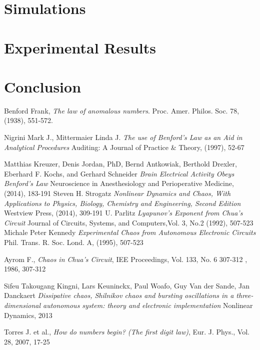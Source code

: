 \message{ !name(resultados.tex)}\documentclass[paper=a4, fontsize=11pt]{scrartcl} %
\numberwithin{equation}{section} %
\numberwithin{figure}{section} %
\numberwithin{table}{section} %
\begin{document}
\section{Simulations}


\section{Experimental Results}



\section{Conclusion}
\begin{thebibliography}{1}

  Benford Frank,
  \emph{The law of anomalous numbers}.
  Proc. Amer. Philos. Soc. 78,
  (1938),
  551-572.

  Nigrini Mark J., Mittermaier Linda J.
  \emph{The use of Benford's Law as an Aid in Analytical Procedures}
  Auditing: A Journal of Practice \& Theory,
  (1997),
  52-67

  Matthias Kreuzer, Denis Jordan, PhD, Bernd Antkowiak, Berthold Drexler, Eberhard F. Kochs, and Gerhard Schneider
  \emph{Brain Electrical Activity Obeys Benford's Law}
  Neuroscience in Anesthesiology and Perioperative Medicine,
  (2014),
  183-191
 Steven H. Strogatz
  \emph{Nonlinear Dynamics and Chaos, With Applications to Physics, Biology, Chemistry and Engineering, Second Edition}
  Westview Press,
  (2014),
  309-191
  U. Parlitz
  \emph{Lyapunov's Exponent from Chua's Circuit}
  Journal of Circuits, Systems, and Computers,Vol. 3, No.2
  (1992),
  507-523
  Michale Peter Kennedy
  \emph{Experimental Chaos from Autonomous Electronic Circuits}
  Phil. Trans. R. Soc. Lond. A,
  (1995),
  507-523

Ayrom F.,
 \emph{Chaos in Chua's Circuit},
 IEE Proceedings, Vol. 133, No. 6 307-312
 , 1986,
 307-312


Sifeu Takougang Kingni, Lars Keuninckx, Paul Woafo,  Guy Van der Sande, Jan Danckaert
\emph{Dissipative chaos, Shilnikov chaos and bursting oscillations
in a three-dimensional autonomous system: theory
and electronic implementation}
Nonlinear Dynamics,
2013

 Torres J. et al.,
 \emph{How do numbers begin? (The first digit law)}, 
  Eur. J. Phys., Vol. 28,
   2007,
   17-25
\end{thebibliography}
\end{document}
